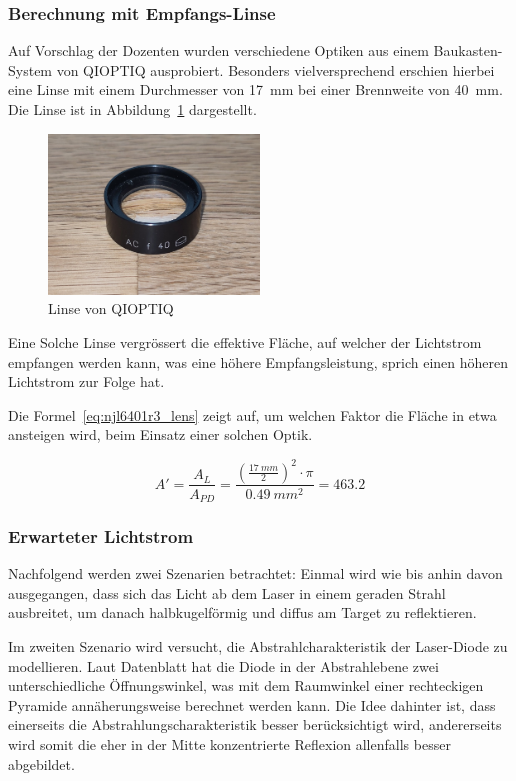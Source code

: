 \subsubsection{Berechnung mit Empfangs-Linse}

Auf Vorschlag der Dozenten wurden verschiedene Optiken aus einem Baukasten-System von QIOPTIQ ausprobiert.
Besonders vielversprechend erschien hierbei eine Linse mit einem Durchmesser von 17~mm bei einer Brennweite von
40~mm. Die Linse ist in Abbildung~\ref{fig:lens} dargestellt.

\begin{figure}[H]
    \centering
    \includegraphics[width=0.5\textwidth]{graphics/photo_lens.jpg}
    \caption{Linse von QIOPTIQ}\label{fig:lens}
\end{figure}

Eine Solche Linse vergrössert die effektive Fläche, auf welcher der Lichtstrom empfangen werden kann, was
eine höhere Empfangsleistung, sprich einen höheren Lichtstrom zur Folge hat.

Die Formel~\ref{eq:njl6401r3_lens} zeigt auf, um welchen Faktor die Fläche in etwa ansteigen wird, beim Einsatz einer
solchen Optik.

\begin{equation}\label{eq:njl6401r3_lens}
    A' = \frac{A_{L}}{A_{PD}} = \frac{(\frac{17~mm}{2})^2 \cdot \pi}{0.49~mm^2} = 463.2
\end{equation}

\subsubsection{Erwarteter Lichtstrom}
Nachfolgend werden zwei Szenarien betrachtet: Einmal wird wie bis anhin davon ausgegangen, dass sich das Licht ab dem Laser
in einem geraden Strahl ausbreitet, um danach halbkugelförmig und diffus am Target zu reflektieren.

Im zweiten Szenario wird versucht, die Abstrahlcharakteristik der Laser-Diode zu modellieren. Laut Datenblatt hat die
Diode in der Abstrahlebene zwei unterschiedliche Öffnungswinkel, was mit dem Raumwinkel einer rechteckigen Pyramide
annäherungsweise berechnet werden kann. Die Idee dahinter ist, dass einerseits die Abstrahlungscharakteristik
besser berücksichtigt wird, andererseits wird somit die eher in der Mitte konzentrierte Reflexion allenfalls besser abgebildet.

